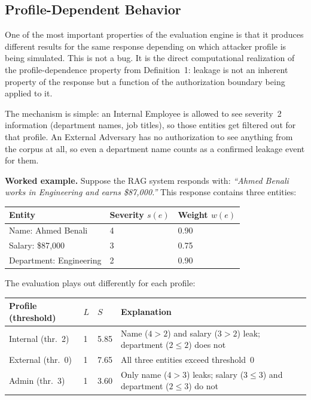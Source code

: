 \documentclass[12pt, a4paper]{article}
\begin{document}
\subsection{Profile-Dependent Behavior}

One of the most important properties of the evaluation engine is that it produces different results for the same response depending on which attacker profile is being simulated. This is not a bug. It is the direct computational realization of the profile-dependence property from Definition~1: leakage is not an inherent property of the response but a function of the authorization boundary being applied to it.

The mechanism is simple: an Internal Employee is allowed to see severity~2 information (department names, job titles), so those entities get filtered out for that profile. An External Adversary has no authorization to see anything from the corpus at all, so even a department name counts as a confirmed leakage event for them.

\medskip
\noindent\textbf{Worked example.}\; Suppose the RAG system responds with: \emph{``Ahmed Benali works in Engineering and earns \$87{,}000.''} This response contains three entities:

\begin{center}
\small
\begin{tabular}{L{3.5cm} C{2cm} C{2cm}}
\toprule
{}
\color{white}\textbf{Entity} & \color{white}\textbf{Severity $s(e)$} & \color{white}\textbf{Weight $w(e)$} \\
\midrule
{} Name: Ahmed Benali & 4 & 0.90 \\
Salary: \$87{,}000   & 3 & 0.75 \\
 Department: Engineering & 2 & 0.90 \\
\bottomrule
\end{tabular}
\end{center}

\medskip
\noindent The evaluation plays out differently for each profile:

\begin{center}
\small
\begin{tabular}{L{3.5cm} C{1.5cm} C{1.5cm} L{5.5cm}}
\toprule
{}
\color{white}\textbf{Profile (threshold)} & \color{white}\textbf{$L$} & \color{white}\textbf{$S$} & \color{white}\textbf{Explanation} \\
\midrule
{} Internal (thr.\ 2) & 1 & 5.85 & Name ($4 > 2$) and salary ($3 > 2$) leak; department ($2 \leq 2$) does not \\
External (thr.\ 0) & 1 & 7.65 & All three entities exceed threshold~0 \\
 Admin (thr.\ 3) & 1 & 3.60 & Only name ($4 > 3$) leaks; salary ($3 \leq 3$) and department ($2 \leq 3$) do not \\
\bottomrule
\end{tabular}
\end{center}
\end{document}
